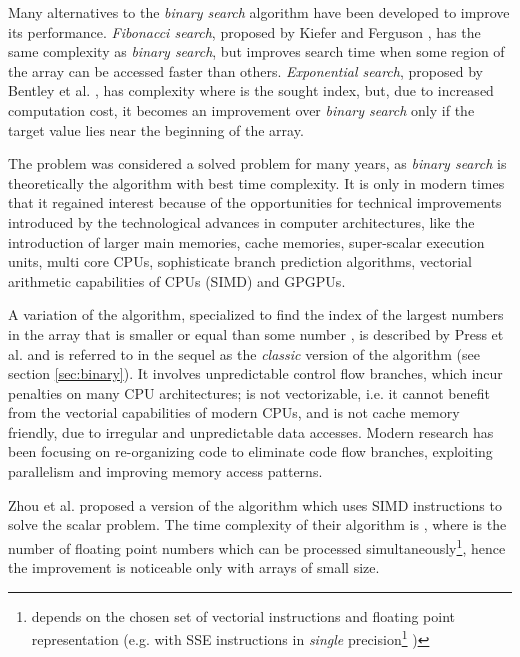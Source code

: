 \documentclass[preprint,1p,times]{elsarticle}
\begin{document}
Many alternatives to the \textit{binary search} algorithm have been developed to improve its performance. \textit{Fibonacci search}, proposed by Kiefer \cite{Kiefer1953} and Ferguson \cite{Ferguson1960}, has the same complexity as \textit{binary search}, but improves search time when some region of the array can be accessed faster than others. \textit{Exponential search}, proposed by Bentley et al. \cite{Bentley1976}, has complexity  where  is the sought index, but, due to increased computation cost, it becomes an improvement over \textit{binary search} only if the target value lies near the beginning of the array. 

The problem was considered a solved problem for many years, as \textit{binary search} is theoretically the algorithm with best time complexity. It is only in modern times that it regained interest because of the opportunities for technical improvements introduced by the technological advances in computer architectures, like the introduction of larger main memories, cache memories, super-scalar execution units, multi core CPUs, sophisticate branch prediction algorithms, vectorial arithmetic capabilities of CPUs (SIMD) and GPGPUs.

A variation of the algorithm, specialized to find the index of the largest numbers in the array  that is smaller or equal than some number , is described by Press et al. \cite{NRC++} and is referred to in the sequel as the \textit{classic} version of the algorithm (see section \ref{sec:binary}). It involves unpredictable control flow branches, which incur penalties on many CPU architectures; is not vectorizable, i.e. it cannot benefit from the vectorial capabilities of modern CPUs, and is not cache memory friendly, due to irregular and unpredictable data accesses. Modern research has been focusing on re-organizing code to eliminate code flow branches, exploiting parallelism and improving memory access patterns.

Zhou et al. \cite{Zhou2002} proposed a version of the algorithm which uses SIMD instructions to solve the scalar problem. The time complexity of their algorithm is , where  is the number of floating point numbers which can be processed simultaneously\footnote{ depends on the chosen set of vectorial instructions and floating point representation (e.g. with SSE instructions in \textit{single} precision\footnote{for a description of \textit{single} and \textit{double} precision floating point representation see \cite{IEEE754}} )}, hence the improvement is noticeable only with arrays  of small size.
\end{document}
